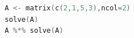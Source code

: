 \begin{lstlisting}[language=c++,label={code:09_04},caption={逆行列の計算}]
A <- matrix(c(2,1,5,3),ncol=2)
solve(A)
A %*% solve(A)
\end{lstlisting}
